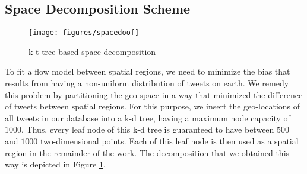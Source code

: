 \subsection{Space Decomposition Scheme}
\begin{figure}[t] \centering \texttt{[image: figures/spacedoof]}
    \caption{k-t tree based space decomposition}
    \label{fig:spacedoof}
    \vspace{-0em}
\end{figure}
To fit a flow model between spatial regions, we need to minimize the bias that
results from having a non-uniform distribution of tweets on earth. We remedy
this problem by partitioning the geo-space in a way that minimized the
difference of tweets between spatial regions. For this purpose, we insert the
geo-locations of all tweets in our database into a k-d tree, having a maximum
node capacity of $1000$. Thus, every leaf node of this k-d tree is guaranteed to
have between $500$ and $1000$ two-dimensional points. Each of this leaf node is
then used as a spatial region in the remainder of the work. The decomposition
that we obtained this way is depicted in Figure \ref{fig:spacedoof}.


